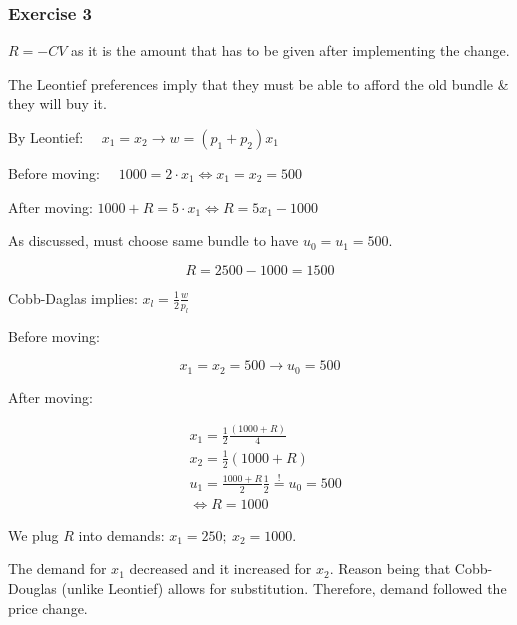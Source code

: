 {
\subsubsection*{Exercise 3}

\begin{enumerate}[label=(\alph*)]
{\item
$R=-C V$ as it is the amount that has to be given after implementing the change.

The Leontief preferences imply that they must be able to afford the old bundle \& they will buy it.

By Leontief: $\quad x_{1}=x_{2} \rightarrow w=\left(p_{1}+p_{2}\right) x_{1}$

Before moving: $\quad 1000=2 \cdot x_{1} \Leftrightarrow x_{1}=x_{2}=500$

After moving: $1000+R=5 \cdot x_{1} \Leftrightarrow R=5 x_{1}-1000$

As discussed, must choose same bundle to have $u_{0}=u_{1}=500$.

$$
R=2500-1000=1500
$$
}
{\item 
Cobb-Daglas implies: $x_{l}=\frac{1}{2} \frac{w}{p_{l}}$

Before moving:

$$
x_{1}=x_{2}=500 \rightarrow u_{0}=500
$$

After moving:

$$
\begin{aligned}
& x_{1}=\frac{1}{2} \frac{(1000+R)}{4} \\
& x_{2}=\frac{1}{2}(1000+R) \\
& u_{1}=\frac{1000+R}{2} \frac{1}{2} \stackrel{!}{=} u_{0}=500 \\
& \Leftrightarrow R=1000
\end{aligned}
$$

We plug $R$ into demands: $x_{1}=250 ;\: x_{2}=1000$.

The demand for $x_{1}$ decreased and it increased for $x_{2}$. Reason being that Cobb-Douglas (unlike Leontief) allows for substitution. Therefore, demand followed the price change.
}
\end{enumerate}
}

